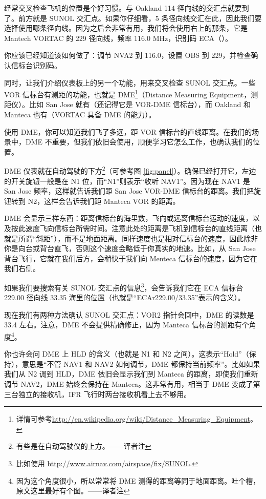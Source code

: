 经常交叉检查飞机的位置是个好习惯。与 Oakland 114 径向线的交汇点就要到了。前方就是 SUNOL 交汇点。如果你仔细看，5 条径向线交汇在此，因此我们要选择使用哪条径向线。因为之后会非常有用，我们将会使用右上的那条，它是 Mantech VORTAC 的 229 径向线，频率 116.0 MHz，识别码 ECA（\mdot\mspace \mdash\mdot\mdash\mdot\mspace \mdot\mdash）。

你应该已经知道该如何做了：调节 NVA2 到 116.0，设置 OBS 到 229，并检查确认信标台识别码。

同时，让我们介绍仪表板上的另一个功能，用来交叉检查 SUNOL 交汇点。一些 VOR 信标台有测距的功能，也就是 DME\footnote{详情可参考\url{http://en.wikipedia.org/wiki/Distance_Measuring_Equipment}。}（Distance Measuring Equipment，测距仪）。比如 San Jose 就有（还记得它是 VOR-DME 信标台），而 Oakland 和 Manteca 也有（VORTAC 具备 DME 的能力）。

使用 DME，你可以知道我们飞了多远，距 VOR 信标台的直线距离。在我们的场景中，DME 不重要，但我们依旧会使用，顺便学习它怎么工作，也确认我们的位置。

DME 仪表就在自动驾驶的下方\footnote{有些是在自动驾驶仪的上方。——译者注}（可参考图 \ref{fig:panel}）。确保已经打开它，左边的开关旋钮一般是在 N1 位，而“N1”则表示“收听 NAV1”。因为现在 NAV1 是 San Jose 频率，这样就告诉我们距 San Jose VOR-DME 信标台的距离。我们把旋钮转到 N2，这样会告诉我们距 Manteca VOR 的距离。

DME 会显示三样东西：距离信标台的海里数，飞向或远离信标台运动的速度，以及按此速度飞向信标台所需时间。注意此处的距离是飞机到信标台的直线距离（也就是所谓“斜距”），而不是地面距离。同样速度也是相对信标台的速度，因此除非你是向台或背台直飞，否则这个速度会略低于你真实的地速。比如，从 San Jose 背台飞行，它就在我们后方，会稍快于我们向 Menteca 信标台的速度，因为它在我们右侧。

如果我们要搜索有关 SUNOL 交汇点的信息\footnote{比如使用 \url{http://www.airnav.com/airspace/fix/SUNOL}.}，会告诉我们它在 ECA 信标台 229.00 径向线 33.35 海里的位置（也就是``ECAr229.00/33.35''表示的含义）。

现在我们有两种方法确认 SUNOL 交汇点：VOR2 指针会回中，DME 的读数是 33.4 左右。注意，DME 不会提供精确修正，因为 Manteca 信标台的测距有个角度\footnote{因为这个角度很小，所以常常将 DME 测得的距离等同于地面距离。吐个槽，原文这里最好有个图。——译者注}。

你也许会问 DME 上 HLD 的含义（也就是 N1 和 N2 之间）。这表示“Hold”（保持），意思是“不管 NAV1 和 NAV2 如何调节，DME 都保持当前频率”。比如如果我们从 N2 调到 HLD，DME 依旧会显示我们到 Manteca 的距离，即使我们重新调节 NAV2，DME 始终会保持在 Manteca。这非常有用，相当于 DME 变成了第三台独立的接收机，IFR 飞行时两台接收机看上去不够用。

